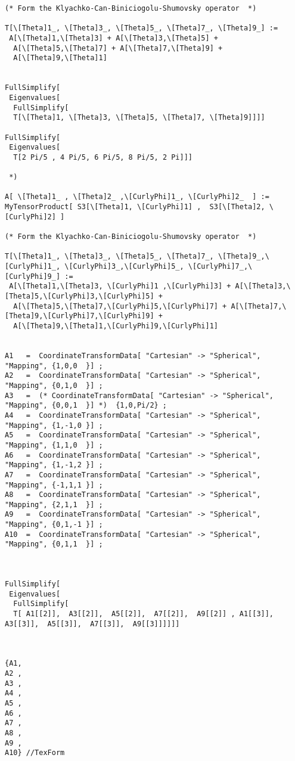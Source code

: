 \documentclass[%
 showpacs,
 showkeys,
 preprintnumbers,
 amsmath,amssymb,
 aps,
  pra,
  longbibliography,
 floatfix,
 ]{revtex4-1}
\begin{document}
{\begin{lstlisting}[backgroundcolor=\color{yellow!10},framerule=0pt,breaklines=true, frame=tb]
(* Form the Klyachko-Can-Biniciogolu-Shumovsky operator  *)

T[\[Theta]1_, \[Theta]3_, \[Theta]5_, \[Theta]7_, \[Theta]9_] :=
 A[\[Theta]1,\[Theta]3] + A[\[Theta]3,\[Theta]5] +
  A[\[Theta]5,\[Theta]7] + A[\[Theta]7,\[Theta]9] +
  A[\[Theta]9,\[Theta]1]


FullSimplify[
 Eigenvalues[
  FullSimplify[
  T[\[Theta]1, \[Theta]3, \[Theta]5, \[Theta]7, \[Theta]9]]]]

FullSimplify[
 Eigenvalues[
  T[2 Pi/5 , 4 Pi/5, 6 Pi/5, 8 Pi/5, 2 Pi]]]

 *)

A[ \[Theta]1_ , \[Theta]2_ ,\[CurlyPhi]1_, \[CurlyPhi]2_  ] :=   MyTensorProduct[ S3[\[Theta]1, \[CurlyPhi]1] ,  S3[\[Theta]2, \[CurlyPhi]2] ]

(* Form the Klyachko-Can-Biniciogolu-Shumovsky operator  *)

T[\[Theta]1_, \[Theta]3_, \[Theta]5_, \[Theta]7_, \[Theta]9_,\[CurlyPhi]1_, \[CurlyPhi]3_,\[CurlyPhi]5_, \[CurlyPhi]7_,\[CurlyPhi]9_] :=
 A[\[Theta]1,\[Theta]3, \[CurlyPhi]1 ,\[CurlyPhi]3] + A[\[Theta]3,\[Theta]5,\[CurlyPhi]3,\[CurlyPhi]5] +
  A[\[Theta]5,\[Theta]7,\[CurlyPhi]5,\[CurlyPhi]7] + A[\[Theta]7,\[Theta]9,\[CurlyPhi]7,\[CurlyPhi]9] +
  A[\[Theta]9,\[Theta]1,\[CurlyPhi]9,\[CurlyPhi]1]


A1   =  CoordinateTransformData[ "Cartesian" -> "Spherical", "Mapping", {1,0,0  }] ;
A2   =  CoordinateTransformData[ "Cartesian" -> "Spherical", "Mapping", {0,1,0  }] ;
A3   =  (* CoordinateTransformData[ "Cartesian" -> "Spherical", "Mapping", {0,0,1  }] *)  {1,0,Pi/2} ;
A4   =  CoordinateTransformData[ "Cartesian" -> "Spherical", "Mapping", {1,-1,0 }] ;
A5   =  CoordinateTransformData[ "Cartesian" -> "Spherical", "Mapping", {1,1,0  }] ;
A6   =  CoordinateTransformData[ "Cartesian" -> "Spherical", "Mapping", {1,-1,2 }] ;
A7   =  CoordinateTransformData[ "Cartesian" -> "Spherical", "Mapping", {-1,1,1 }] ;
A8   =  CoordinateTransformData[ "Cartesian" -> "Spherical", "Mapping", {2,1,1  }] ;
A9   =  CoordinateTransformData[ "Cartesian" -> "Spherical", "Mapping", {0,1,-1 }] ;
A10  =  CoordinateTransformData[ "Cartesian" -> "Spherical", "Mapping", {0,1,1  }] ;



FullSimplify[
 Eigenvalues[
  FullSimplify[
  T[ A1[[2]],  A3[[2]],  A5[[2]],  A7[[2]],  A9[[2]] , A1[[3]],  A3[[3]],  A5[[3]],  A7[[3]],  A9[[3]]]]]]



{A1,
A2 ,
A3 ,
A4 ,
A5 ,
A6 ,
A7 ,
A8 ,
A9 ,
A10} //TexForm

\end{lstlisting}  }
\end{document}
